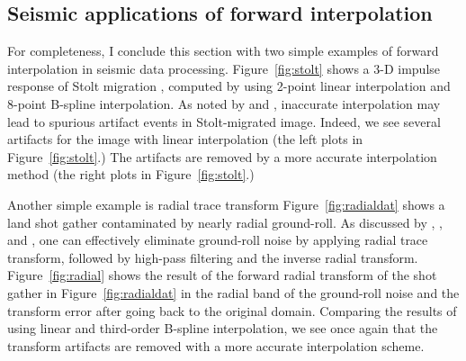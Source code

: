 \subsection{Seismic applications of forward interpolation}

For completeness, I conclude this section with two simple examples of
forward interpolation in seismic data processing.
Figure~\ref{fig:stolt} shows a 3-D impulse response of Stolt migration
\cite{GEO43.01.00230048}, computed by using 2-point linear
interpolation and 8-point B-spline interpolation. As noted by
 and ,
inaccurate interpolation may lead to spurious artifact events in
Stolt-migrated image. Indeed, we see several artifacts for the image
with linear interpolation (the left plots in Figure~\ref{fig:stolt}.)
The artifacts are removed by a more accurate interpolation method (the
right plots in Figure~\ref{fig:stolt}.)


\par
Another simple example is radial trace transform
\cite{Ottolini.sepphd.33} Figure~\ref{fig:radialdat} shows a land shot
gather contaminated by nearly radial ground-roll. As discussed by
, , and
, one can effectively eliminate
ground-roll noise by applying radial trace transform, followed by
high-pass filtering and the inverse radial transform.
Figure~\ref{fig:radial} shows the result of the forward radial
transform of the shot gather in Figure~\ref{fig:radialdat} in the
radial band of the ground-roll noise and the transform error after
going back to the original domain. Comparing the results of using
linear and third-order B-spline interpolation, we see once again that
the transform artifacts are removed with a more accurate interpolation
scheme.



